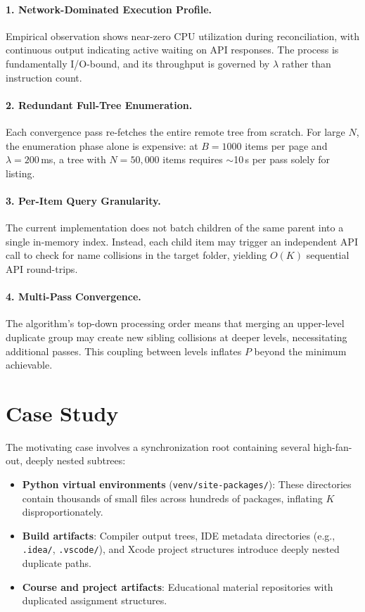 \documentclass[12pt,a4paper]{article}
\begin{document}
\paragraph{1. Network-Dominated Execution Profile.}
Empirical observation shows near-zero CPU utilization during reconciliation, with continuous output indicating active waiting on API responses. The process is fundamentally I/O-bound, and its throughput is governed by $\lambda$ rather than instruction count.

\paragraph{2. Redundant Full-Tree Enumeration.}
Each convergence pass re-fetches the entire remote tree from scratch. For large $N$, the enumeration phase alone is expensive: at $B = 1000$ items per page and $\lambda = 200$\,ms, a tree with $N = 50{,}000$ items requires $\sim$10\,s per pass solely for listing.

\paragraph{3. Per-Item Query Granularity.}
The current implementation does not batch children of the same parent into a single in-memory index. Instead, each child item may trigger an independent API call to check for name collisions in the target folder, yielding $O(K)$ sequential API round-trips.

\paragraph{4. Multi-Pass Convergence.}
The algorithm's top-down processing order means that merging an upper-level duplicate group may create new sibling collisions at deeper levels, necessitating additional passes. This coupling between levels inflates $P$ beyond the minimum achievable.


\section{Case Study}
\label{sec:casestudy}

The motivating case involves a synchronization root containing several high-fan-out, deeply nested subtrees:

\begin{itemize}[nosep]
  \item \textbf{Python virtual environments} (\texttt{venv/site-packages/}): These directories contain thousands of small files across hundreds of packages, inflating $K$ disproportionately.
  \item \textbf{Build artifacts}: Compiler output trees, IDE metadata directories (e.g., \texttt{.idea/}, \texttt{.vscode/}), and Xcode project structures introduce deeply nested duplicate paths.
  \item \textbf{Course and project artifacts}: Educational material repositories with duplicated assignment structures.
\end{itemize}
\end{document}
